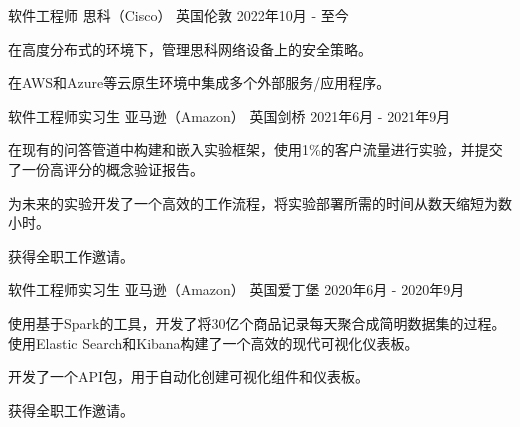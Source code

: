 
\begin{cventries}


\cventry
{软件工程师} %
{思科（Cisco）} %
{英国伦敦} %
{2022年10月 - 至今} %
{
\begin{cvitems} %
\item {在高度分布式的环境下，管理思科网络设备上的安全策略。}
\item {在AWS和Azure等云原生环境中集成多个外部服务/应用程序。}
\end{cvitems}
}

\cventry
{软件工程师实习生} %
{亚马逊（Amazon）} %
{英国剑桥} %
{2021年6月 - 2021年9月} %
{
\begin{cvitems} %
\item {在现有的问答管道中构建和嵌入实验框架，使用1\%的客户流量进行实验，并提交了一份高评分的概念验证报告。}
\item {为未来的实验开发了一个高效的工作流程，将实验部署所需的时间从数天缩短为数小时。}
\item {获得全职工作邀请。}
\end{cvitems}
}

\cventry
{软件工程师实习生} %
{亚马逊（Amazon）} %
{英国爱丁堡} %
{2020年6月 - 2020年9月} %
{
\begin{cvitems} %
\item {使用基于Spark的工具，开发了将\approx 30亿个商品记录每天聚合成简明数据集的过程。使用Elastic Search和Kibana构建了一个高效的现代可视化仪表板。}
\item {开发了一个API包，用于自动化创建可视化组件和仪表板。}
\item {获得全职工作邀请。}
\end{cvitems}
}


\end{cventries}